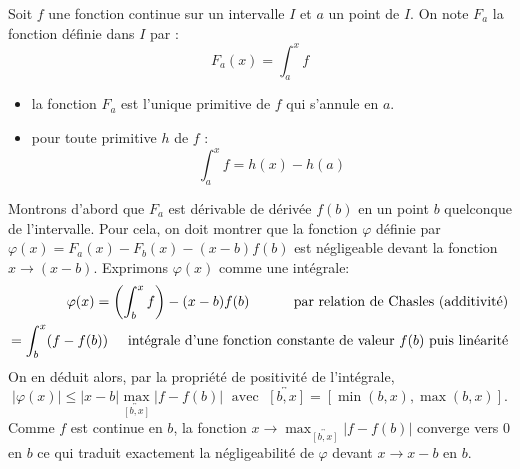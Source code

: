 \begin{thm}
Soit $f$ une fonction continue sur un intervalle $I$ et $a$ un point de $I$. On note $F_a$ la fonction définie dans $I$ par :
\begin{displaymath}
 F_a(x)=\int _a ^x f
\end{displaymath}
\begin{itemize}
 \item la fonction $F_a$ est l'unique primitive de $f$ qui s'annule en $a$.
\item pour toute primitive $h$ de $f$ :
\begin{displaymath}
 \int _a ^x f =h(x)-h(a)
\end{displaymath}
\end{itemize}
\end{thm}
\begin{demo}
 Montrons d'abord que $F_a$ est dérivable de dérivée $f(b)$ en un point $b$ quelconque de l'intervalle. Pour cela, on doit montrer que la fonction $\varphi$ définie par $\varphi(x)= F_a(x)-F_b(x)-(x-b)f(b)$ est négligeable devant la fonction $x\rightarrow(x-b)$. Exprimons $\varphi(x)$ comme une intégrale:
\begin{align*}
 \varphi(x) = \left( \int_{b}^{x}f \right)  -(x-b)f(b) \hspace{1cm}\text{ par relation de Chasles (additivité)}\\
= \int_{b}^{x}(f-f(b)) \hspace{0.5cm}\text{intégrale d'une fonction constante de valeur $f(b)$ puis linéarité}
\end{align*}
On en déduit alors, par la propriété de positivité de l'intégrale,
\begin{displaymath}
 |\varphi(x)|\leq |x-b|\max_{\overleftrightarrow{[b,x]}}|f-f(b)| 
 \;\text{ avec }\; \overleftrightarrow{[b,x]} = [\min(b,x),\max(b,x)].
\end{displaymath}
Comme $f$ est continue en $b$, la fonction $x\rightarrow \max_{\overleftrightarrow{[b,x]}}\left| f-f(b) \right|$ converge vers $0$ en $b$ ce qui traduit exactement la négligeabilité de $\varphi$ devant $x\rightarrow x-b$ en $b$.
\end{demo}


